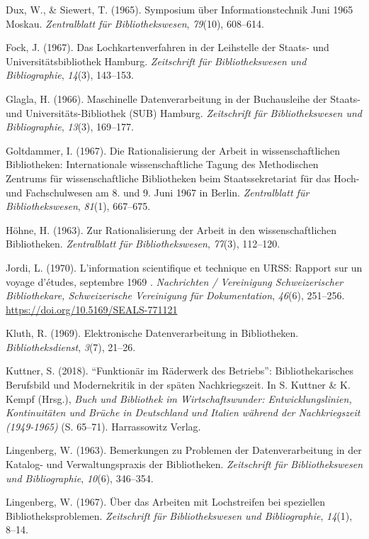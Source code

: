 \documentclass[a4paper,
fontsize=11pt,
oneside,
numbers=noperiodatend,
parskip=half-,
bibliography=totoc,
final
]{scrartcl}
\begin{document}
Dux, W., \& Siewert, T. (1965). Symposium über Informationstechnik Juni
1965 Moskau. \emph{Zentralblatt für Bibliothekswesen}, \emph{79}(10),
608--614.

Fock, J. (1967). Das Lochkartenverfahren in der Leihstelle der Staats-
und Universitätsbibliothek Hamburg. \emph{Zeitschrift für
Bibliothekswesen und Bibliographie}, \emph{14}(3), 143--153.

Glagla, H. (1966). Maschinelle Datenverarbeitung in der Buchausleihe der
Staats- und Universitäts-Bibliothek (SUB) Hamburg. \emph{Zeitschrift für
Bibliothekswesen und Bibliographie}, \emph{13}(3), 169--177.

Goltdammer, I. (1967). Die Rationalisierung der Arbeit in
wissenschaftlichen Bibliotheken: Internationale wissenschaftliche Tagung
des Methodischen Zentrums für wissenschaftliche Bibliotheken beim
Staatssekretariat für das Hoch- und Fachschulwesen am 8. und 9. Juni
1967 in Berlin. \emph{Zentralblatt für Bibliothekswesen}, \emph{81}(1),
667--675.

Höhne, H. (1963). Zur Rationalisierung der Arbeit in den
wissenschaftlichen Bibliotheken. \emph{Zentralblatt für
Bibliothekswesen}, \emph{77}(3), 112--120.

Jordi, L. (1970). L'information scientifique et technique en URSS:
Rapport sur un voyage d'études, septembre 1969 . \emph{Nachrichten /
Vereinigung Schweizerischer Bibliothekare, Schweizerische Vereinigung
für Dokumentation}, \emph{46}(6), 251--256.
\url{https://doi.org/10.5169/SEALS-771121}

Kluth, R. (1969). Elektronische Datenverarbeitung in Bibliotheken.
\emph{Bibliotheksdienst}, \emph{3}(7), 21--26.

Kuttner, S. (2018). \enquote{Funktionär im Räderwerk des Betriebs}:
Bibliothekarisches Berufsbild und Modernekritik in der späten
Nachkriegszeit. In S. Kuttner \& K. Kempf (Hrsg.), \emph{Buch und
Bibliothek im Wirtschaftswunder: Entwicklungslinien, Kontinuitäten und
Brüche in Deutschland und Italien während der Nachkriegszeit
(1949-1965)} (S. 65--71). Harrassowitz Verlag.

Lingenberg, W. (1963). Bemerkungen zu Problemen der Datenverarbeitung in
der Katalog- und Verwaltungspraxis der Bibliotheken. \emph{Zeitschrift
für Bibliothekswesen und Bibliographie}, \emph{10}(6), 346--354.

Lingenberg, W. (1967). Über das Arbeiten mit Lochstreifen bei speziellen
Bibliotheksproblemen. \emph{Zeitschrift für Bibliothekswesen und
Bibliographie}, \emph{14}(1), 8--14.
\end{document}
